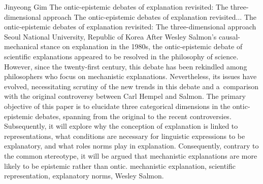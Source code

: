 \begin{artengenv}{Jinyeong Gim}
	{The ontic-epistemic debates of explanation revisited: The three-dimensional approach}
	{The ontic-epistemic debates of explanation revisited$\ldots$}
	{The ontic-epistemic debates of explanation revisited: The three-di\-men\-sional approach}
	{Seoul National University, Republic of Korea}
	{After Wesley Salmon's causal-mechanical stance on explanation in the 1980s, the ontic-epistemic debate of scientific explanations appeared to be resolved in the philosophy of science. However, since the twenty-first century, this debate has been rekindled among philosophers who focus on mechanistic explanations. Nevertheless, its issues have evolved, necessitating scrutiny of the new trends in this debate and a~comparison with the original controversy between Carl Hempel and Salmon. The primary objective of this paper is to elucidate three categorical dimensions in the ontic-epistemic debates, spanning from the original to the recent controversies. Subsequently, it will explore why the conception of explanation is linked to representations, what conditions are necessary for linguistic expressions to be explanatory, and what roles norms play in explanation. Consequently, contrary to the common stereotype, it will be argued that mechanistic explanations are more likely to be epistemic rather than ontic.
	}
	{mechanistic explanation, scientific representation, explanatory norms, Wesley Salmon.}







\end{artengenv}
